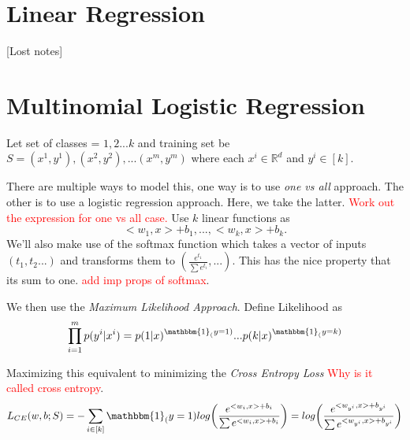 \section{Linear Regression}
[Lost notes]

\section{Multinomial Logistic Regression}
Let set of classes = ${1,2...k}$ and training set be $S = {(x^1, y^1), (x^2, y^2), ... (x^m, y^m)}$ where each $x^i \in \mathbb{R}^d$ and $y^i \in [k]$. 

There are multiple ways to model this, one way is to use \textit{one vs all} approach. The other is to use a logistic regression approach. Here, we take the latter. \textcolor{red}{Work out the expression for one vs all case.} Use $k$ linear functions as 
\[
	<w_1,x> + b_1, ..., <w_k, x> + b_k.
\]
We'll also make use of the softmax function which takes a vector of inputs $(t_1, t_2...)$ and transforms them to $(\frac{e^{t_1}}{\sum e^{t_i}}, ... )$. This has the nice property that its sum to one. \textcolor{red}{add imp props of softmax}.

We then use the \textit{Maximum Likelihood Approach}. Define Likelihood as
\[
	\prod_{i=1}^{m}p(y^i|x^i) = p(1|x)^{\mathbbm{1}_(y=1)}...p(k|x)^{\mathbbm{1}_(y=k)}
\]

Maximizing this equivalent to minimizing the \textit{Cross Entropy Loss} \textcolor{red}{Why is it called cross entropy}.
\[
	L_{CE}(w,b;S) = -\sum_{i\in[k]}\mathbbm{1}_(y=1)log\bigg(\frac{e^{<w_i,x>+b_i}}{\sum e^{<w_i,x>+b_i}}\bigg) = log\bigg( \frac{e^{<w_{y^i},x>+b_{y^i}}}{\sum e^{<w_{y^i},x>+b_{y^i}}} \bigg)
\]